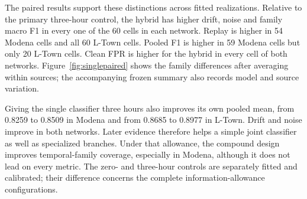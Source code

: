 The paired results support these distinctions across fitted realizations. Relative to the primary three-hour control, the hybrid has higher drift, noise and family macro F1 in every one of the 60 cells in each network. Replay is higher in 54 Modena cells and all 60 L-Town cells. Pooled F1 is higher in 59 Modena cells but only 20 L-Town cells. Clean FPR is higher for the hybrid in every cell of both networks. Figure~\ref{fig:singlepaired} shows the family differences after averaging within sources; the accompanying frozen summary also records model and source variation.

Giving the single classifier three hours also improves its own pooled mean, from 0.8259 to 0.8509 in Modena and from 0.8685 to 0.8977 in L-Town. Drift and noise improve in both networks. Later evidence therefore helps a simple joint classifier as well as specialized branches. Under that allowance, the compound design improves temporal-family coverage, especially in Modena, although it does not lead on every metric. The zero- and three-hour controls are separately fitted and calibrated; their difference concerns the complete information-allowance configurations.
